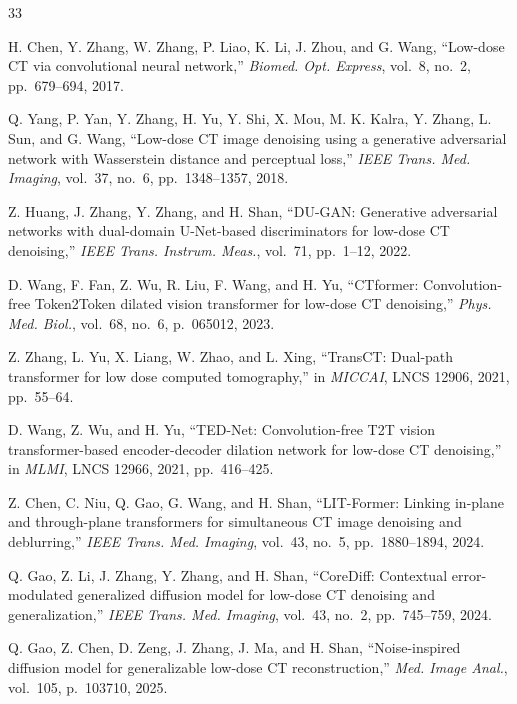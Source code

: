 \documentclass[conference]{IEEEtran}
\begin{document}
\begin{thebibliography}{33}

 H. Chen, Y. Zhang, W. Zhang, P. Liao, K. Li, J. Zhou,
and G. Wang, ``Low-dose CT via convolutional neural network,'' \emph{Biomed.
Opt. Express}, vol.~8, no.~2, pp.~679--694, 2017.

 Q. Yang, P. Yan, Y. Zhang, H. Yu, Y. Shi, X. Mou,
M. K. Kalra, Y. Zhang, L. Sun, and G. Wang, ``Low-dose CT image denoising using
a generative adversarial network with Wasserstein distance and perceptual
loss,'' \emph{IEEE Trans. Med. Imaging}, vol.~37, no.~6, pp.~1348--1357, 2018.

 Z. Huang, J. Zhang, Y. Zhang, and H. Shan, ``DU-GAN:
Generative adversarial networks with dual-domain U-Net-based discriminators for
low-dose CT denoising,'' \emph{IEEE Trans. Instrum. Meas.}, vol.~71, pp.~1--12,
2022.

 D. Wang, F. Fan, Z. Wu, R. Liu, F. Wang, and H. Yu,
``CTformer: Convolution-free Token2Token dilated vision transformer for
low-dose CT denoising,'' \emph{Phys. Med. Biol.}, vol.~68, no.~6, p.~065012,
2023.

 Z. Zhang, L. Yu, X. Liang, W. Zhao, and L. Xing,
``TransCT: Dual-path transformer for low dose computed tomography,'' in
\emph{MICCAI}, LNCS 12906, 2021, pp.~55--64.

 D. Wang, Z. Wu, and H. Yu, ``TED-Net: Convolution-free
T2T vision transformer-based encoder-decoder dilation network for low-dose CT
denoising,'' in \emph{MLMI}, LNCS 12966, 2021, pp.~416--425.

 Z. Chen, C. Niu, Q. Gao, G. Wang, and H. Shan,
``LIT-Former: Linking in-plane and through-plane transformers for simultaneous
CT image denoising and deblurring,'' \emph{IEEE Trans. Med. Imaging}, vol.~43,
no.~5, pp.~1880--1894, 2024.

 Q. Gao, Z. Li, J. Zhang, Y. Zhang, and H. Shan,
``CoreDiff: Contextual error-modulated generalized diffusion model for low-dose
CT denoising and generalization,'' \emph{IEEE Trans. Med. Imaging}, vol.~43,
no.~2, pp.~745--759, 2024.

 Q. Gao, Z. Chen, D. Zeng, J. Zhang, J. Ma, and H. Shan,
``Noise-inspired diffusion model for generalizable low-dose CT
reconstruction,'' \emph{Med. Image Anal.}, vol.~105, p.~103710, 2025.


\end{thebibliography}
\end{document}
